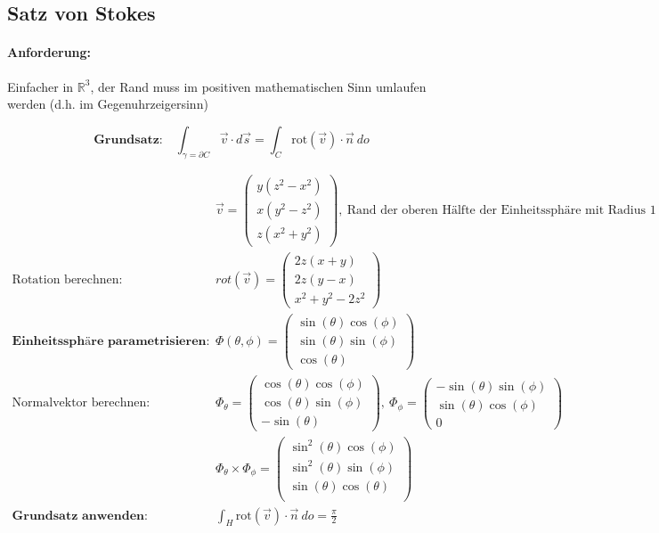 \documentclass[11pt]{article}
\begin{document}
\subsection{Satz von Stokes}

\paragraph{Anforderung:} Einfacher in $\mathbb{R}^3$, der Rand muss im positiven mathematischen Sinn umlaufen werden (d.h. im Gegenuhrzeigersinn)

\begin{equation*}
	\textbf{Grundsatz:}\quad\int_{\gamma = \partial C} \vec{v} \cdot d\vec{s} = \int_C \text{rot}(\vec{v}) \cdot \vec{n}\ do
\end{equation*}

\begin{equation*}
\begin{split}
	& \vec{v} = \begin{pmatrix}
		y(z^2-x^2) \\ x(y^2 - z^2) \\ z(x^2 + y^2)
	\end{pmatrix},\ \text{Rand der oberen H{\"a}lfte der Einheitssph{\"a}re mit Radius $1$ um $(0,0, 0)$} \\
	\text{Rotation berechnen:}\quad & rot(\vec{v}) = \begin{pmatrix}
		2z(x+y) \\ 2z(y-x) \\ x^2 + y^2 - 2z^2
	\end{pmatrix} \\
	\textbf{Einheitssph{\"a}re parametrisieren:}\quad & \Phi(\theta, \phi) = \begin{pmatrix}
		\sin(\theta)\cos(\phi) \\ \sin(\theta)\sin(\phi) \\ \cos(\theta)
	\end{pmatrix} \\
	\text{Normalvektor berechnen:}\quad & \Phi_\theta = \begin{pmatrix}
		\cos(\theta)\cos(\phi) \\ \cos(\theta)\sin(\phi) \\ -\sin(\theta)
	\end{pmatrix},\ \Phi_\phi = \begin{pmatrix}
		-\sin(\theta)\sin(\phi) \\ \sin(\theta)\cos(\phi) \\ 0
	\end{pmatrix} \\
	& \Phi_\theta \times \Phi_\phi = \begin{pmatrix}
		\sin^2(\theta)\cos(\phi) \\ \sin^2(\theta)\sin(\phi) \\ \sin(\theta)\cos(\theta) \\
	\end{pmatrix} \\
	\textbf{Grundsatz anwenden:} \quad & \int_H \text{rot}(\vec{v}) \cdot \vec{n}\ do = \frac{\pi}{2}
\end{split}
\end{equation*}
\end{document}
